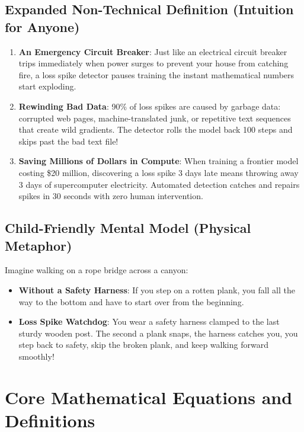 \documentclass[11pt,a4paper]{article}
\theoremstyle{definition}
\begin{document}
\subsection{Expanded Non-Technical Definition (Intuition for Anyone)}
\begin{enumerate}
    \item \textbf{An Emergency Circuit Breaker}: Just like an electrical circuit breaker trips immediately when power surges to prevent your house from catching fire, a loss spike detector pauses training the instant mathematical numbers start exploding.
    \item \textbf{Rewinding Bad Data}: 90\% of loss spikes are caused by garbage data: corrupted web pages, machine-translated junk, or repetitive text sequences that create wild gradients. The detector rolls the model back 100 steps and skips past the bad text file!
    \item \textbf{Saving Millions of Dollars in Compute}: When training a frontier model costing \$20 million, discovering a loss spike 3 days late means throwing away 3 days of supercomputer electricity. Automated detection catches and repairs spikes in 30 seconds with zero human intervention.
\end{enumerate}

\subsection{Child-Friendly Mental Model (Physical Metaphor)}
Imagine walking on a rope bridge across a canyon:
\begin{itemize}
    \item \textbf{Without a Safety Harness}: If you step on a rotten plank, you fall all the way to the bottom and have to start over from the beginning.
    \item \textbf{Loss Spike Watchdog}: You wear a safety harness clamped to the last sturdy wooden post. The second a plank snaps, the harness catches you, you step back to safety, skip the broken plank, and keep walking forward smoothly!
\end{itemize}

\section{Core Mathematical Equations and Definitions}
\end{document}
